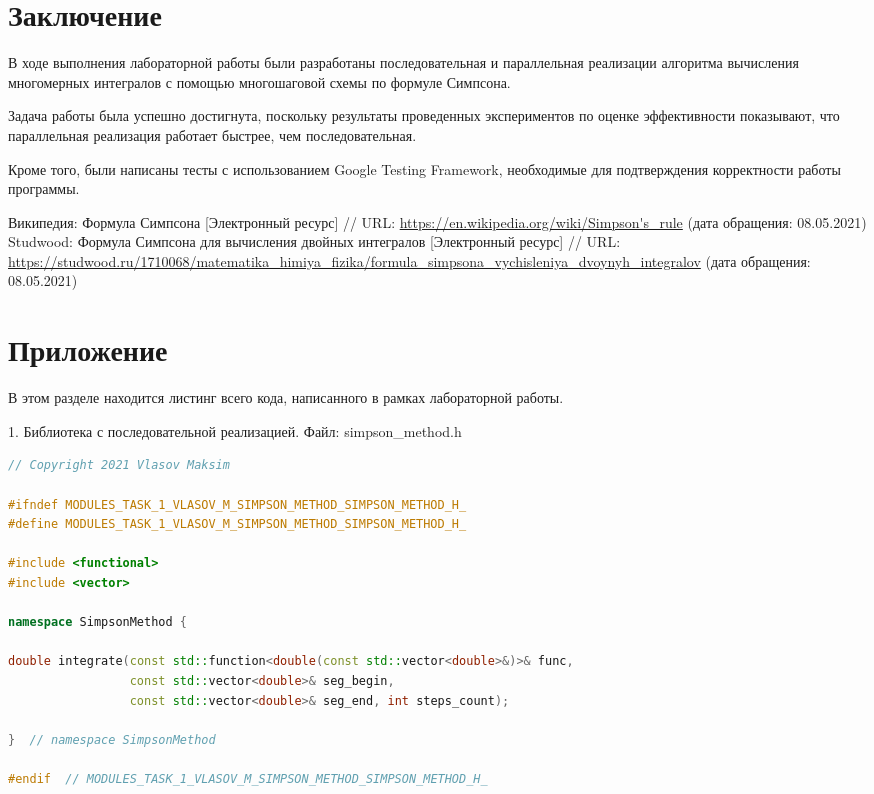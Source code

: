 \documentclass{report}
\begin{document}
\section*{Заключение}
В ходе выполнения лабораторной работы были разработаны последовательная и параллельная реализации алгоритма вычисления многомерных интегралов с помощью многошаговой схемы по формуле Симпсона.
\par Задача работы была успешно достигнута, поскольку результаты проведенных экспериментов по оценке эффективности показывают, что параллельная реализация работает быстрее, чем последовательная.
\par Кроме того, были написаны тесты с использованием Google Testing Framework, необходимые для подтверждения корректности работы программы.
\newpage

\begin{thebibliography}{1}
 Википедия: Формула Симпсона [Электронный ресурс] // URL: \url {https://en.wikipedia.org/wiki/Simpson's_rule} (дата обращения: 08.05.2021)
 Studwood: Формула Симпсона для вычисления двойных интегралов [Электронный ресурс] // URL: \url {https://studwood.ru/1710068/matematika_himiya_fizika/formula_simpsona_vychisleniya_dvoynyh_integralov} (дата обращения: 08.05.2021)
\end{thebibliography}
\newpage

\section*{Приложение}
В этом разделе находится листинг всего кода, написанного в рамках лабораторной работы.
\par 1. Библиотека с последовательной реализацией. Файл: simpson\_method.h
\begin{lstlisting}[language=C++]
// Copyright 2021 Vlasov Maksim

#ifndef MODULES_TASK_1_VLASOV_M_SIMPSON_METHOD_SIMPSON_METHOD_H_
#define MODULES_TASK_1_VLASOV_M_SIMPSON_METHOD_SIMPSON_METHOD_H_

#include <functional>
#include <vector>

namespace SimpsonMethod {

double integrate(const std::function<double(const std::vector<double>&)>& func,
                 const std::vector<double>& seg_begin,
                 const std::vector<double>& seg_end, int steps_count);

}  // namespace SimpsonMethod

#endif  // MODULES_TASK_1_VLASOV_M_SIMPSON_METHOD_SIMPSON_METHOD_H_
\end{lstlisting}
\end{document}
